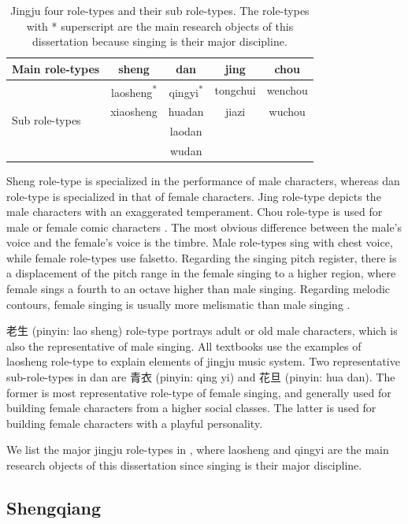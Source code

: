 \begin{table}[ht!]
\centering
\begin{tabular}{l|cccc}
\toprule
Main role-types & sheng               & dan                           & jing & chou \\
\midrule
\multirow{4}{*}{Sub role-types} & laosheng\textsuperscript{*} & qingyi\textsuperscript{*} & tongchui    & wenchou   \\
& xiaosheng & huadan & jiazi & wuchou \\
&&laodan&& \\
&&wudan&& \\
\bottomrule
\end{tabular}
\caption{Jingju four role-types and their sub role-types. The role-types with * superscript are the main research objects of this dissertation because singing is their major discipline.}
\label{tab:role-types}
\end{table}

Sheng role-type is specialized in the performance of male characters, whereas dan role-type is specialized in that of female characters. Jing role-type depicts the male characters with an exaggerated temperament. Chou role-type is used for male or female comic characters \cite{Repetto2018}. The most obvious difference between the male's voice and the female's voice is the timbre. Male role-types sing with chest voice, while female role-types use falsetto. Regarding the singing pitch register, there is a displacement of the pitch range in the female singing to a higher region, where female sings a fourth to an octave higher than male singing. Regarding melodic contours, female singing is usually more melismatic than male singing \cite{Wichmann1991a}. 

老生 (pinyin: lao sheng) role-type portrays adult or old male characters, which is also the representative of male singing. All textbooks use the examples of laosheng role-type to explain elements of jingju music system. Two representative sub-role-types in dan are 青衣 (pinyin: qing yi) and 花旦 (pinyin: hua dan). The former is most representative role-type of female singing, and generally used for building female characters from a higher social classes. The latter is used for building female characters with a playful personality.

We list the major jingju role-types in , where laosheng and qingyi are the main research objects of this dissertation since singing is their major discipline.

\subsection{Shengqiang}

